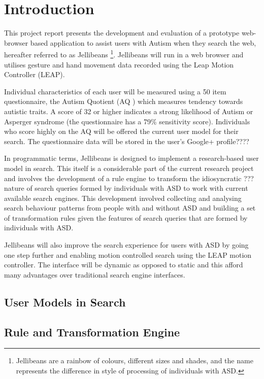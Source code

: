 \documentclass[a4paper, 11pt]{article}
\begin{document}
\section{Introduction}\label{intro}

This project report presents the development and evaluation of a prototype web-browser based application to assist users with Autism when they search the web, hereafter referred to as Jellibeans \footnote{Jellibeans are a rainbow of colours, different sizes and shades, and the name represents the difference in style of processing of individuals with ASD.}. Jellibeans will run in a web browser and utilises gesture and hand movement data recorded using the Leap Motion Controller (LEAP). 

Individual characteristics of each user will be measured using a 50 item questionnaire, the Autism Quotient (AQ \cite{Baron Cohen et al}) which measures tendency towards autistic traits. A score of 32 or higher indicates a strong likelihood of Autism or Asperger syndrome (the questionnaire has a 79\% sensitivity score). Individuals who score highly on the AQ will be offered the current user model for their search. The questionnaire data will be stored in the user's Google+ profile????

In programmatic terms, Jellibeans is designed to implement a research-based user model in search. This itself is a considerable part of the current research project and involves the development of a rule engine to transform the idiosyncratic ??? nature of search queries formed by individuals with ASD to work with current available search engines. This development involved collecting and analysing search behaviour patterns from people with and without ASD and building a set of transformation rules given the features of search queries that are formed by individuals with ASD.

Jellibeans will also improve the search experience for users with ASD by going one step further and enabling motion controlled search using the LEAP motion controller. The interface will be dynamic as opposed to static and this afford many advantages over traditional search engine interfaces.

\subsection {User Models in Search}

\subsection {Rule and Transformation Engine}
\end{document}
